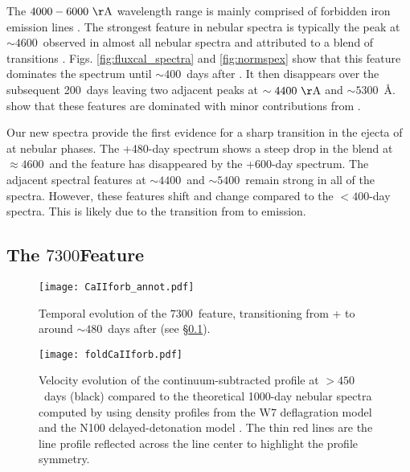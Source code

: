 \documentclass[twocolumn]{aastex63}
\begin{document}
The $4000-6000~\rm\AA$ wavelength range is mainly comprised of forbidden iron emission lines \citep[e.g., ][]{mazzali2015, wilk2020}. The strongest feature in nebular spectra is typically the peak at $\sim 4600$~\AAA observed in almost all nebular \sneia spectra and attributed to a blend of  transitions \citep[e.g., ][]{graham2017, maguire2018, tucker2020}. Figs. \ref{fig:fluxcal_spectra} and \ref{fig:normspex} show that this feature dominates the spectrum until $\sim400$~days after \tmax. It then disappears over the subsequent 200~days leaving two adjacent peaks at $\sim 4400~\rm\AA$ and $\sim 5300$~\AA. \citet{fransson2015} show that these features are dominated  with minor contributions from .

Our new spectra provide the first evidence for a sharp transition in the ejecta of \sneia at nebular phases. The +480-day spectrum shows a steep drop in the  blend at $\approx 4600$~\AAA and the feature has disappeared by the +600-day spectrum. The adjacent spectral features at $\sim 4400$~\AAA and $\sim 5400$~\AAA remain strong in all of the spectra. However, these features shift and change compared to the $<400$-day spectra. This is likely due to the transition from  to  emission.


\subsection{The $7300$\AAA Feature}\label{subsec:results.caii}

\begin{figure}
    \centering
    \texttt{[image: CaIIforb\_annot.pdf]}
    \caption{Temporal evolution of the $7300$~\AAA feature, transitioning from + to \CaII around $\sim 480$~days after \tmax (see \S\ref{subsec:results.caii}).}
    \label{fig:CaIIannotate}
\end{figure}


\begin{figure}
    \centering
    \texttt{[image: foldCaIIforb.pdf]}
    \caption{Velocity evolution of the continuum-subtracted \CaII profile at $>450$~days (black) compared to the theoretical 1000-day nebular spectra computed by \citet{fransson2015} using density profiles from the W7 deflagration model \citep[green, ][]{iwamoto1999} and the N100 delayed-detonation model \citep[blue, ][]{seitenzahl2013b}. The thin red lines are the line profile reflected across the line center to highlight the profile symmetry. }
    \label{fig:CaIIfold}
\end{figure}
\end{document}
